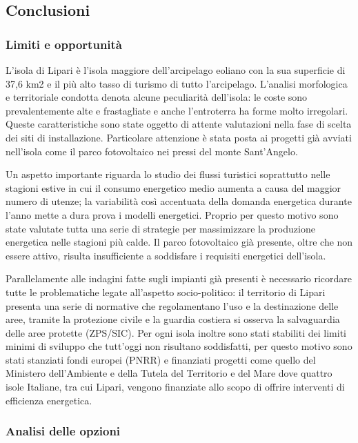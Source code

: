 \documentclass[fleqn,11pt]{SelfArx} %
\begin{document}
\subsection{Conclusioni}
\subsubsection{Limiti e opportunità}

L'isola di Lipari è l'isola maggiore dell'arcipelago eoliano con la sua superficie di 37,6 km2 e il più alto tasso di turismo di tutto l'arcipelago. L'analisi morfologica e territoriale condotta denota alcune peculiarità dell'isola: le coste sono prevalentemente alte e frastagliate e anche l'entroterra ha forme molto irregolari. Queste caratteristiche sono state oggetto di attente valutazioni nella fase di scelta dei siti di installazione. Particolare attenzione è stata posta ai progetti già avviati nell'isola come il parco fotovoltaico nei pressi del monte Sant'Angelo. 

Un aspetto importante riguarda lo studio dei flussi turistici soprattutto nelle stagioni estive in cui il consumo energetico medio aumenta a causa del maggior numero di utenze; la variabilità così accentuata della domanda energetica durante l'anno mette a dura prova i modelli energetici. Proprio per questo motivo sono state valutate tutta una serie di strategie per massimizzare la produzione energetica nelle stagioni più calde. Il parco fotovoltaico già presente, oltre che non essere attivo, risulta insufficiente a soddisfare i requisiti energetici dell'isola. 

Parallelamente alle indagini fatte sugli impianti già presenti è necessario ricordare tutte le problematiche legate all'aspetto socio-politico: il territorio di Lipari presenta una serie di normative che regolamentano l'uso e la destinazione delle aree, tramite la protezione civile e la guardia costiera si osserva la salvaguardia delle aree protette (ZPS/SIC). Per ogni isola inoltre sono stati stabiliti dei limiti minimi di sviluppo che tutt'oggi non risultano soddisfatti, per questo motivo sono stati stanziati fondi europei (PNRR) e finanziati progetti come quello del Ministero dell'Ambiente e della Tutela del Territorio e del Mare dove quattro isole Italiane, tra cui Lipari, vengono finanziate allo scopo di offrire interventi di efficienza energetica.


\subsubsection{Analisi delle opzioni}
\end{document}
